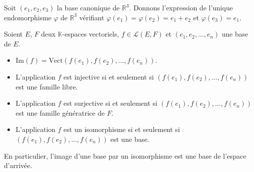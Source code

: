 \documentclass[a4paper,10pt]{report}
\begin{document}
\begin{ex} Soit $(e_1, e_2, e_3)$ la base canonique de $\mathbb{R}^3$. Donnons l'expression de l'unique endomorphisme $\varphi$ de $\mathbb{R}^3$ vérifiant $\varphi(e_1)= \varphi(e_2)= e_1+e_2$ et $\varphi(e_3)=e_1$.

\vspace{8cm}
\end{ex}

\begin{thm} Soient $E$, $F$ deux $\mathbb{K}$-espaces vectoriels, $f \in \mathcal{L}(E,F)$ et $(e_1, e_2, \ldots, e_n)$ une base de $E$.

\begin{itemize}
\item $\textrm{Im}(f) = \textrm{Vect}(f(e_1), f(e_2), \ldots, f(e_n))$.
\item L'application $f$ est injective si et seulement si $(f(e_1), f(e_2), \ldots, f(e_n))$ est une famille libre.
\item L'application $f$ est surjective si et seulement si $(f(e_1), f(e_2), \ldots, f(e_n))$ est une famille génératrice de $F$.
\item L'application $f$ est un isomorphisme si et seulement si $(f(e_1), f(e_2), \ldots, f(e_n))$ est une base.
\end{itemize}
\end{thm}

\begin{rem} En particulier, l'image d'une base par un isomorphisme est une base de l'espace d'arrivée.
\end{rem}
\end{document}
